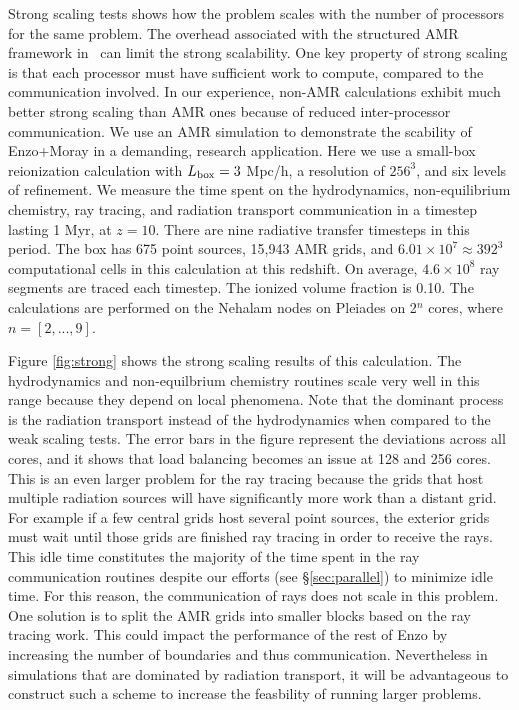 \documentclass[useAMS,usenatbib,a4paper]{mn2e}
\begin{document}
Strong scaling tests shows how the problem scales with the number of
processors for the same problem.  The overhead associated with the
structured AMR framework in \enzo~can limit the strong scalability.
One key property of strong scaling is that each processor must have
sufficient work to compute, compared to the communication involved.
In our experience, non-AMR calculations exhibit much better strong
scaling than AMR ones because of reduced inter-processor
communication.  We use an AMR simulation to demonstrate the scability
of Enzo+Moray in a demanding, research application.  Here we use a
small-box reionization calculation with $L_{\rm box} = 3$ Mpc/h, a
resolution of $256^3$, and six levels of refinement.  We measure the
time spent on the hydrodynamics, non-equilibrium chemistry, ray
tracing, and radiation transport communication in a timestep lasting 1
Myr, at $z=10$.  There are nine radiative transfer timesteps in this
period.  The box has 675 point sources, 15,943 AMR grids, and $6.01
\times 10^7 \approx 392^3$ computational cells in this calculation at
this redshift.  On average, $4.6 \times 10^8$ ray segments are traced
each timestep.  The ionized volume fraction is 0.10.  The calculations
are performed on the Nehalam nodes on Pleiades on 2$^n$ cores, where
$n = [2,...,9]$.

Figure \ref{fig:strong} shows the strong scaling results of this
calculation.  The hydrodynamics and non-equilbrium chemistry routines
scale very well in this range because they depend on local phenomena.
Note that the dominant process is the radiation transport instead of
the hydrodynamics when compared to the weak scaling tests.  The error
bars in the figure represent the deviations across all cores, and it
shows that load balancing becomes an issue at 128 and 256 cores.  This
is an even larger problem for the ray tracing because the grids that
host multiple radiation sources will have significantly more work than
a distant grid.  For example if a few central grids host several point
sources, the exterior grids must wait until those grids are finished
ray tracing in order to receive the rays.  This idle time constitutes
the majority of the time spent in the ray communication routines
despite our efforts (see \S\ref{sec:parallel}) to minimize idle time.
For this reason, the communication of rays does not scale in this
problem.  One solution is to split the AMR grids into smaller blocks
based on the ray tracing work.  This could impact the performance of
the rest of Enzo by increasing the number of boundaries and thus
communication.  Nevertheless in simulations that are dominated by
radiation transport, it will be advantageous to construct such a
scheme to increase the feasbility of running larger problems.
\end{document}
